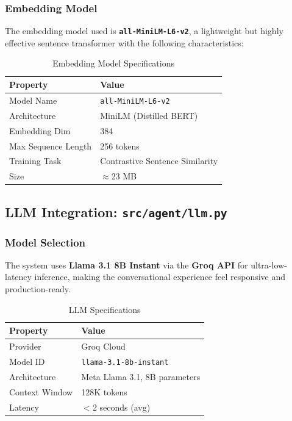 \documentclass[12pt,a4paper]{article}
\newcommand{\code}[1]{\texttt{\small\color{blue!70!black}#1}}
\begin{document}
\subsubsection{Embedding Model}

The embedding model used is \textbf{\code{all-MiniLM-L6-v2}}, a lightweight but highly effective sentence transformer with the following characteristics:

\begin{table}[H]
\centering
\caption{Embedding Model Specifications}
\begin{tabular}{ll}
\toprule
\textbf{Property} & \textbf{Value} \\
\midrule
Model Name     & \code{all-MiniLM-L6-v2} \\
Architecture   & MiniLM (Distilled BERT) \\
Embedding Dim  & 384 \\
Max Sequence Length & 256 tokens \\
Training Task  & Contrastive Sentence Similarity \\
Size           & $\approx$23 MB \\
\bottomrule
\end{tabular}
\end{table}

\subsection{LLM Integration: \code{src/agent/llm.py}}

\subsubsection{Model Selection}

The system uses \textbf{Llama 3.1 8B Instant} via the \textbf{Groq API} for ultra-low-latency inference, making the conversational experience feel responsive and production-ready.

\begin{table}[H]
\centering
\caption{LLM Specifications}
\begin{tabular}{ll}
\toprule
\textbf{Property} & \textbf{Value} \\
\midrule
Provider       & Groq Cloud \\
Model ID       & \code{llama-3.1-8b-instant} \\
Architecture   & Meta Llama 3.1, 8B parameters \\
Context Window & 128K tokens \\
Latency        & $<$2 seconds (avg) \\
\bottomrule
\end{tabular}
\end{table}
\end{document}
